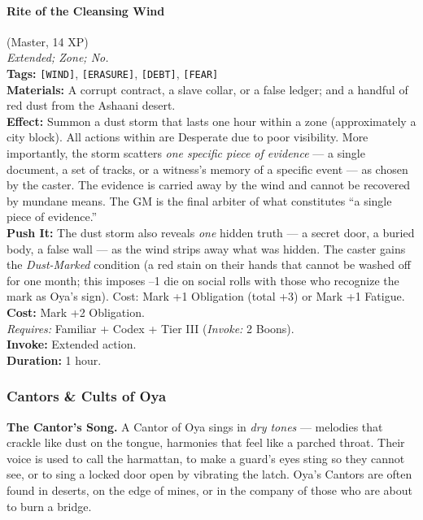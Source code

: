 \paragraph{Rite of the Cleansing Wind} (Master, 14 XP) \hfill \\
\emph{Extended; Zone; No.} \\
\textbf{Tags:} \texttt{[WIND]}, \texttt{[ERASURE]}, \texttt{[DEBT]}, \texttt{[FEAR]} \\
\textbf{Materials:} A corrupt contract, a slave collar, or a false ledger; and a handful of red dust from the Ashaani desert. \\
\textbf{Effect:} Summon a dust storm that lasts one hour within a zone (approximately a city block). All actions within are Desperate due to poor visibility. More importantly, the storm scatters \textit{one specific piece of evidence} --- a single document, a set of tracks, or a witness's memory of a specific event --- as chosen by the caster. The evidence is carried away by the wind and cannot be recovered by mundane means. The GM is the final arbiter of what constitutes ``a single piece of evidence.'' \\
\textbf{Push It:} The dust storm also reveals \textit{one} hidden truth --- a secret door, a buried body, a false wall --- as the wind strips away what was hidden. The caster gains the \textit{Dust-Marked} condition (a red stain on their hands that cannot be washed off for one month; this imposes --1 die on social rolls with those who recognize the mark as Oya's sign). Cost: Mark +1 Obligation (total +3) or Mark +1 Fatigue. \\
\textbf{Cost:} Mark +2 Obligation. \\
\textit{Requires:} Familiar + Codex + Tier III (\textit{Invoke:} 2 Boons). \\
\textbf{Invoke:} Extended action. \\
\textbf{Duration:} 1 hour.

\subsubsection*{Cantors \& Cults of Oya}

\textbf{The Cantor's Song.} A Cantor of Oya sings in \textit{dry tones} --- melodies that crackle like dust on the tongue, harmonies that feel like a parched throat. Their voice is used to call the harmattan, to make a guard's eyes sting so they cannot see, or to sing a locked door open by vibrating the latch. Oya's Cantors are often found in deserts, on the edge of mines, or in the company of those who are about to burn a bridge.


